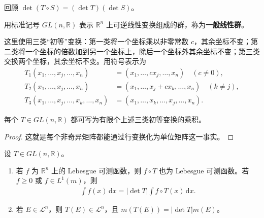 \documentclass[../../main.tex]{subfiles}%
\begin{document}
\begin{remark}
回顾 $\det(T\circ S)=(\det T)(\det S)$。
\end{remark}
\begin{definition}[一般线性群]\label{definition:ch02-general-linear-group}
用标准记号 $GL(n,\mathbb{R})$ 表示 $\mathbb{R}^n$ 上可逆线性变换组成的群，称为\textbf{一般线性群}。
\end{definition}
\begin{definition}[三类初等线性变换]\label{definition:ch02-elementary-linear-transformations}
这里使用三类“初等”变换：第一类将一个坐标乘以非零常数 $c$，其余坐标不变；第二类将一个坐标的倍数加到另一个坐标上，除后一个坐标外其余坐标不变；第三类交换两个坐标，其余坐标不变。用符号表示为
\begin{align*}
T_1(x_1,\ldots,x_j,\ldots,x_n)&=(x_1,\ldots,cx_j,\ldots,x_n)\quad(c\ne0),\\
T_2(x_1,\ldots,x_j,\ldots,x_n)&=(x_1,\ldots,x_j+cx_k,\ldots,x_n)\quad(k\ne j),\\
T_3(x_1,\ldots,x_j,\ldots,x_k,\ldots,x_n)&=(x_1,\ldots,x_k,\ldots,x_j,\ldots,x_n).
\end{align*}
\end{definition}
\begin{proposition}\label{proposition:ch02-elementary-factorization}
每个 $T\in GL(n,\mathbb{R})$ 都可写为有限个上述三类初等变换的乘积。
\end{proposition}
\begin{proof}
这就是每个非奇异矩阵都能通过行变换化为单位矩阵这一事实。
\end{proof}
\begin{theorem}\label{theorem:ch02-linear-change}
设 $T\in GL(n,\mathbb{R})$。
\begin{enumerate}
\item\label{item:ch02-linear-change-integrals} 若 $f$ 为 $\mathbb{R}^n$ 上的 Lebesgue 可测函数，则 $f\circ T$ 也为 Lebesgue 可测函数。若 $f\ge0$ 或 $f\in L^1(m)$，则
\begin{align}\label{align:ch02-linear-change}
\int f(x)\,\mathrm{d}x=|\det T|\int f\circ T(x)\,\mathrm{d}x.
\end{align}
\item\label{item:ch02-linear-change-sets} 若 $E\in\mathscr{L}^n$，则 $T(E)\in\mathscr{L}^n$，且 $m(T(E))=|\det T|m(E)$。
\end{enumerate}
\end{theorem}
\end{document}

